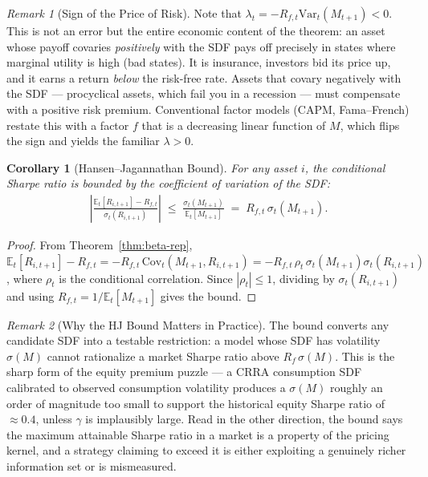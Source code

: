 \documentclass[11pt]{article}
\theoremstyle{definition}
\theoremstyle{plain}
\newtheorem{corollary}{Corollary}[section]
\theoremstyle{remark}
\newtheorem{remark}{Remark}[section]
\begin{document}
\begin{remark}[Sign of the Price of Risk]
    Note that $\lambda_t = -R_{f,t}\mathrm{Var}_t(M_{t+1}) < 0$. This is not an error but the entire economic content of the theorem: an asset whose payoff covaries \emph{positively} with the SDF pays off precisely in states where marginal utility is high (bad states). It is insurance, investors bid its price up, and it earns a return \emph{below} the risk-free rate. Assets that covary negatively with the SDF --- procyclical assets, which fail you in a recession --- must compensate with a positive risk premium. Conventional factor models (CAPM, Fama--French) restate this with a factor $f$ that is a decreasing linear function of $M$, which flips the sign and yields the familiar $\lambda > 0$.
\end{remark}

\begin{corollary}[Hansen--Jagannathan Bound]
    For any asset $i$, the conditional Sharpe ratio is bounded by the coefficient of variation of the SDF:
    \begin{align}
        \left|\frac{\mathbb{E}_t[R_{i,t+1}] - R_{f,t}}{\sigma_t(R_{i,t+1})}\right|
        \;\leq\; \frac{\sigma_t(M_{t+1})}{\mathbb{E}_t[M_{t+1}]}
        \;=\; R_{f,t}\,\sigma_t(M_{t+1}).
    \end{align}
\end{corollary}
\begin{proof}
    From Theorem~\ref{thm:beta-rep}, $\mathbb{E}_t[R_{i,t+1}] - R_{f,t} = -R_{f,t}\,\mathrm{Cov}_t(M_{t+1},R_{i,t+1}) = -R_{f,t}\,\rho_t\,\sigma_t(M_{t+1})\sigma_t(R_{i,t+1})$, where $\rho_t$ is the conditional correlation. Since $|\rho_t| \leq 1$, dividing by $\sigma_t(R_{i,t+1})$ and using $R_{f,t} = 1/\mathbb{E}_t[M_{t+1}]$ gives the bound.
\end{proof}

\begin{remark}[Why the HJ Bound Matters in Practice]
    The bound converts any candidate SDF into a testable restriction: a model whose SDF has volatility $\sigma(M)$ cannot rationalize a market Sharpe ratio above $R_f\,\sigma(M)$. This is the sharp form of the equity premium puzzle --- a CRRA consumption SDF calibrated to observed consumption volatility produces a $\sigma(M)$ roughly an order of magnitude too small to support the historical equity Sharpe ratio of $\approx 0.4$, unless $\gamma$ is implausibly large. Read in the other direction, the bound says the maximum attainable Sharpe ratio in a market is a property of the pricing kernel, and a strategy claiming to exceed it is either exploiting a genuinely richer information set or is mismeasured.
\end{remark}
\end{document}
